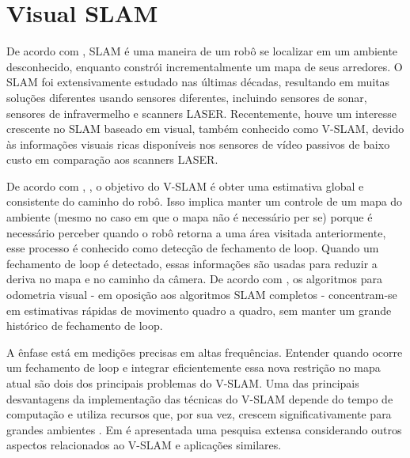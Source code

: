 \section{Visual SLAM}
\label{sec:visualslam}

De acordo com \cite{yousif2015overview}, \cite{fraundorfer2011visual} SLAM é uma maneira de um robô se localizar em um ambiente desconhecido, enquanto constrói incrementalmente um mapa de seus arredores. O SLAM foi extensivamente estudado nas últimas décadas, resultando em muitas soluções diferentes usando sensores diferentes, incluindo sensores de sonar, sensores de infravermelho e scanners LASER. Recentemente, houve um interesse crescente no SLAM baseado em visual, também conhecido como V-SLAM, devido às informações visuais ricas disponíveis nos sensores de vídeo passivos de baixo custo em comparação aos scanners LASER.

De acordo com \cite{fraundorfer2011visual}, \cite{nister2004visual}, o objetivo do V-SLAM é obter uma estimativa global e consistente do caminho do robô. Isso implica manter um controle de um mapa do ambiente (mesmo no caso em que o mapa não é necessário per se) porque é necessário perceber quando o robô retorna a uma área visitada anteriormente, esse processo é conhecido como detecção de fechamento de loop. Quando um fechamento de loop é detectado, essas informações são usadas para reduzir a deriva no mapa e no caminho da câmera. De acordo com \cite{wirth2013visual}, os algoritmos para odometria visual - em oposição aos algoritmos SLAM completos - concentram-se em estimativas rápidas de movimento quadro a quadro, sem manter um grande histórico de fechamento de loop.

A ênfase está em medições precisas em altas frequências. Entender quando ocorre um fechamento de loop e integrar eficientemente essa nova restrição no mapa atual são dois dos principais problemas do V-SLAM. Uma das principais desvantagens da implementação das técnicas do V-SLAM depende do tempo de computação e utiliza recursos que, por sua vez, crescem significativamente para grandes ambientes \cite{nawaf2017towards}. Em \cite{strasdat2012visual} é apresentada uma pesquisa extensa considerando outros aspectos relacionados ao V-SLAM e aplicações similares.

